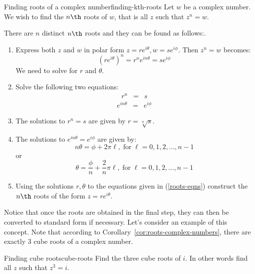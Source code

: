 \begin{procedure}{Finding roots of a complex number}{finding-kth-roots}
Let $w$ be a complex number. We wish to find the $n\th$ roots of $w$, that is all $z$ such that $z^n = w$. 

There are $n$ distinct $n\th$ roots and they can be found as follows:. 
 
\begin{enumerate}
\item Express both $z$ and $w$ in polar form $z=re^{i\theta}, w=se^{i\phi}$. Then $z^n = w$ becomes:
\[
(re^{i\theta})^n = r^n e^{i n \theta} = se^{i\phi}
\]
We need to solve for $r$ and $\theta$. 
\item Solve the following two equations:
\begin{eqnarray*}
r^n &=& s 
\end{eqnarray*}
\begin{eqnarray}
e^{i n \theta} &=& e^{i \phi}
\label{roots-eqns}
\end{eqnarray}
\item The solutions to $r^n = s$ are given by $r = \sqrt[n]{s}$. 

\item The solutions to $e^{i n \theta} = e^{i \phi}$ are given by:
\[
n\theta = \phi + 2\pi \ell,  \; \mbox{for} \; \ell = 0,1,2,\ldots, n-1
\]
or
\[
\theta = \frac{\phi}{n} + \frac{2}{n} \pi \ell, \; \mbox{for} \; \ell = 0,1,2,\ldots, n-1 
\]
\item
Using the solutions $r, \theta$ to the equations given in (\ref{roots-eqns})
construct the $n\th$ roots of the form $z = re^{i\theta}$.  
\end{enumerate}
\end{procedure}

Notice that once the roots are obtained in the final step, they can then be converted to standard form if necessary. Let's consider an example of this concept. Note that according to Corollary~\ref{cor:roots-complex-numbers}, 
there are exactly $3$ cube roots of a complex number.

\begin{example}{Finding cube roots}{cube-roots}
Find the three cube roots of $i$. In other words find all $z$ such that $z^3 = i$. 
\end{example}

